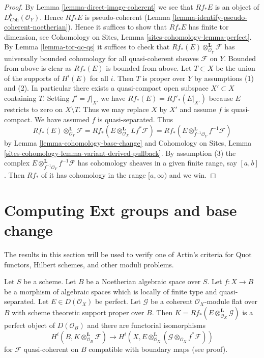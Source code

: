 \begin{proof}
By Lemma \ref{lemma-direct-image-coherent} we see that $Rf_*E$ is an object of
$D^b_{\textit{Coh}}(\mathcal{O}_Y)$. Hence $Rf_*E$ is pseudo-coherent
(Lemma \ref{lemma-identify-pseudo-coherent-noetherian}).
Hence it suffices to show that $Rf_*E$ has finite tor dimension, see
Cohomology on Sites, Lemma \ref{sites-cohomology-lemma-perfect}.
By Lemma \ref{lemma-tor-qc-qs} it suffices to check that
$Rf_*(E) \otimes_{\mathcal{O}_Y}^\mathbf{L} \mathcal{F}$
has universally bounded cohomology for all quasi-coherent
sheaves $\mathcal{F}$ on $Y$. Bounded from above is clear as $Rf_*(E)$
is bounded from above. Let $T \subset X$ be the union of the supports
of $H^i(E)$ for all $i$. Then $T$ is proper over $Y$ by assumptions (1)
and (2). In particular there exists a quasi-compact open subspace
$X' \subset X$ containing $T$. Setting $f' = f|_{X'}$ we have
$Rf_*(E) = Rf'_*(E|_{X'})$ because $E$ restricts to zero on $X \setminus T$.
Thus we may replace $X$ by $X'$ and assume $f$ is quasi-compact.
We have assumed $f$ is quasi-separated. Thus
$$
Rf_*(E) \otimes_{\mathcal{O}_Y}^\mathbf{L} \mathcal{F} =
Rf_*\left(E \otimes_{\mathcal{O}_X}^\mathbf{L} Lf^*\mathcal{F}\right) =
Rf_*\left(E \otimes_{f^{-1}\mathcal{O}_Y}^\mathbf{L} f^{-1}\mathcal{F}\right)
$$
by
Lemma \ref{lemma-cohomology-base-change}
and
Cohomology on Sites, Lemma
\ref{sites-cohomology-lemma-variant-derived-pullback}.
By assumption (3) the complex
$E \otimes_{f^{-1}\mathcal{O}_Y}^\mathbf{L} f^{-1}\mathcal{F}$
has cohomology sheaves in a
given finite range, say $[a, b]$. Then $Rf_*$ of it
has cohomology in the range $[a, \infty)$ and we win.
\end{proof}






\section{Computing Ext groups and base change}
\label{section-ext}

\noindent
The results in this section will be used to verify one of Artin's criteria
for Quot functors, Hilbert schemes, and other moduli problems.

\begin{lemma}
\label{lemma-compute-tensor-perfect}
Let $S$ be a scheme. Let $B$ be a Noetherian algebraic space over $S$.
Let $f : X \to B$ be a morphism of algebraic spaces which is locally of
finite type and quasi-separated. Let $E \in D(\mathcal{O}_X)$ be perfect.
Let $\mathcal{G}$ be a coherent $\mathcal{O}_X$-module flat over $B$
with scheme theoretic support proper over $B$. Then
$K = Rf_*(E \otimes^\mathbf{L}_{\mathcal{O}_X} \mathcal{G})$
is a perfect object of $D(\mathcal{O}_B)$ and there are functorial isomorphisms
$$
H^i(B, K \otimes^\mathbf{L}_{\mathcal{O}_B} \mathcal{F})
\longrightarrow
H^i(X, E \otimes^\mathbf{L}_{\mathcal{O}_X}
(\mathcal{G} \otimes_{\mathcal{O}_X} f^*\mathcal{F}))
$$
for $\mathcal{F}$ quasi-coherent on $B$
compatible with boundary maps (see proof).
\end{lemma}

